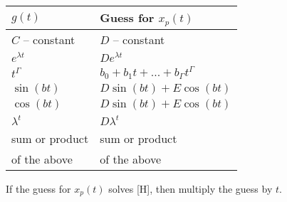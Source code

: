 \documentclass[twoside]{article}
\begin{document}
\begin{table}[htbp]
\begin{tabular}{ll}
$g(t)$ & Guess for $x_p(t)$ \\ \hline
$C$ -- constant  & $D$ -- constant \\
$e^{\lambda t}$ & $D e^{\lambda t}$   \\
$t^\Gamma$ & $b_0+b_1 t + ... + b_\Gamma t^\Gamma$ \\
$\sin(bt)$ & $D\sin(bt)+E\cos(bt)$ \\
$\cos(bt)$ & $D\sin(bt)+E\cos(bt)$ \\
$\lambda^t$ & $D \lambda^t$ \\
sum or product & sum or product \\
 of the above &  of the above  
\end{tabular}
\end{table}

\begin{remark}
    If the guess for $x_p(t)$ solves [H], then multiply the guess by $t$.
\end{remark}
\end{document}
